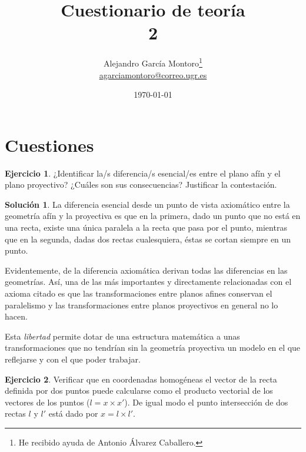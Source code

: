 \documentclass[a4paper, 11pt]{article}
\title{Cuestionario de teoría \\ 2}
\author{Alejandro García Montoro\footnote{He recibido ayuda de Antonio Álvarez Caballero.}\\
    \href{mailto:agarciamontoro@correo.ugr.es}{agarciamontoro@correo.ugr.es}}
\date{\today}
\theoremstyle{definition}
\newtheorem{ejercicio}{Ejercicio}
\newtheorem*{solucion}{Solución}
\theoremstyle{theorem}
\begin{document}
  \maketitle

  \section{Cuestiones}

  \begin{ejercicio}
      ¿Identificar la/s diferencia/s esencial/es entre el plano afín y el plano proyectivo? ¿Cuáles son sus consecuencias? Justificar la contestación.
  \end{ejercicio}

  \begin{solucion}
      La diferencia esencial desde un punto de vista axiomático entre la geometría afín y la proyectiva es que en la primera, dado un punto que no está en una recta, existe una única paralela a la recta que pasa por el punto, mientras que en la segunda, dadas dos rectas cualesquiera, éstas se cortan siempre en un punto.

      Evidentemente, de la diferencia axiomática derivan todas las diferencias en las geometrías. Así, una de las más importantes y directamente relacionadas con el axioma citado es que las transformaciones entre planos afines conservan el paralelismo y las transformaciones entre planos proyectivos en general no lo hacen.

      Esta \emph{libertad} permite dotar de una estructura matemática a unas transformaciones que no tendrían sin la geometría proyectiva un modelo en el que reflejarse y con el que poder trabajar.
  \end{solucion}

  \begin{ejercicio}
      Verificar que en coordenadas homogéneas el vector de la recta definida por dos puntos puede calcularse como el producto vectorial de los vectores de los puntos ($l = x \times x'$). De igual modo el punto intersección de dos rectas $l$ y $l'$ está dado por $x = l \times l'$.
  \end{ejercicio}
\end{document}
